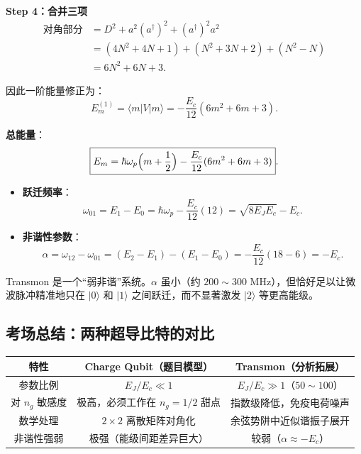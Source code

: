 \textbf{Step 4：合并三项}
\begin{align*}
\text{对角部分} &= D^2 + a^2(a^\dagger)^2 + (a^\dagger)^2 a^2 \\
&= (4N^2+4N+1) + (N^2+3N+2) + (N^2-N) \\
&= 6N^2 + 6N + 3.
\end{align*}

因此一阶能量修正为：
\[
E_m^{(1)} = \langle m|V|m\rangle = -\frac{E_c}{12}(6m^2 + 6m + 3).
\]

\textbf{总能量}：
\[
\boxed{E_m = \hbar\omega_p\Bigl(m + \frac{1}{2}\Bigr) - \frac{E_c}{12}(6m^2 + 6m + 3)}.
\]

\begin{insightbox}[关键物理量的完整推导]
\begin{itemize}[nosep]
    \item \textbf{跃迁频率}：
    \[
    \omega_{01} = E_1 - E_0 = \hbar\omega_p - \frac{E_c}{12}(12) = \sqrt{8E_J E_c} - E_c.
    \]
    \item \textbf{非谐性参数}：
    \[
    \alpha = \omega_{12} - \omega_{01} = (E_2 - E_1) - (E_1 - E_0) = -\frac{E_c}{12}(18 - 6) = -E_c.
    \]
\end{itemize}
Transmon 是一个``弱非谐''系统。$\alpha$ 虽小（约 $200\sim 300$ MHz），但恰好足以让微波脉冲精准地只在 $|0\rangle$ 和 $|1\rangle$ 之间跃迁，而不显著激发 $|2\rangle$ 等更高能级。
\end{insightbox}

\subsection{考场总结：两种超导比特的对比}

\begin{center}
\renewcommand{\arraystretch}{1.5}
\begin{tabular}{|c|c|c|}
\hline
\textbf{特性} & \textbf{Charge Qubit（题目模型）} & \textbf{Transmon（分析拓展）} \\
\hline
参数比例 & $E_J / E_c \ll 1$ & $E_J / E_c \gg 1$（$50\sim 100$） \\
\hline
对 $n_g$ 敏感度 & 极高，必须工作在 $n_g=1/2$ 甜点 & 指数级降低，免疫电荷噪声 \\
\hline
数学处理 & $2\times 2$ 离散矩阵对角化 & 余弦势阱中近似谐振子展开 \\
\hline
非谐性强弱 & 极强（能级间距差异巨大） & 较弱（$\alpha \approx -E_c$） \\
\hline
\end{tabular}
\end{center}

